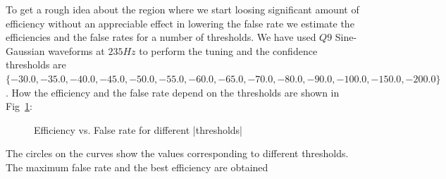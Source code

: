 \documentclass{article}
\begin{document}
To get a rough idea about the region where we start loosing significant 
amount of efficiency without an appreciable effect in lowering the false 
rate we estimate the efficiencies and the false rates for a number of 
thresholds. We have used $Q9$ Sine-Gaussian waveforms at $235 Hz $ to
perform the tuning and the confidence thresholds are
$\{-30.0, -35.0, -40.0, -45.0, -50.0, -55.0, -60.0, -65.0, -70.0, -80.0, 
-90.0, -100.0, -150.0, -200.0\}$. How the efficiency and the false rate 
depend on the thresholds are shown in Fig~\ref{fig:dt125df128tune}: 
\begin{figure}
\begin{center}
\caption{Efficiency vs. False rate for different |thresholds|}
\label{fig:dt125df128tune}
\end{center}
\end{figure}
The circles on the curves show the values corresponding to different 
thresholds.  The maximum false rate and the best efficiency are obtained 
\end{document}

